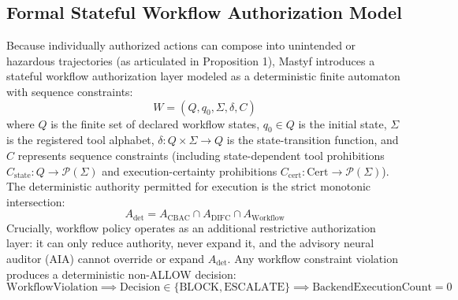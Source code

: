 \documentclass[10pt,journal,compsoc]{IEEEtran}
\begin{document}
\subsection{Formal Stateful Workflow Authorization Model}
Because individually authorized actions can compose into unintended or hazardous trajectories (as articulated in Proposition 1), Mastyf introduces a stateful workflow authorization layer modeled as a deterministic finite automaton with sequence constraints:
\begin{equation}
W = (Q, q_0, \Sigma, \delta, C)
\end{equation}
where $Q$ is the finite set of declared workflow states, $q_0 \in Q$ is the initial state, $\Sigma$ is the registered tool alphabet, $\delta: Q \times \Sigma \to Q$ is the state-transition function, and $C$ represents sequence constraints (including state-dependent tool prohibitions $C_{\text{state}}: Q \to \mathcal{P}(\Sigma)$ and execution-certainty prohibitions $C_{\text{cert}}: \text{Cert} \to \mathcal{P}(\Sigma)$). The deterministic authority permitted for execution is the strict monotonic intersection:
\begin{equation}
A_{\text{det}} = A_{\text{CBAC}} \cap A_{\text{DIFC}} \cap A_{\text{Workflow}}
\end{equation}
Crucially, workflow policy operates as an additional restrictive authorization layer: it can only reduce authority, never expand it, and the advisory neural auditor (AIA) cannot override or expand $A_{\text{det}}$. Any workflow constraint violation produces a deterministic non-ALLOW decision:
\begin{equation}
\text{WorkflowViolation} \implies \text{Decision} \in \{\text{BLOCK}, \text{ESCALATE}\} \implies \text{BackendExecutionCount} = 0
\end{equation}
\end{document}
